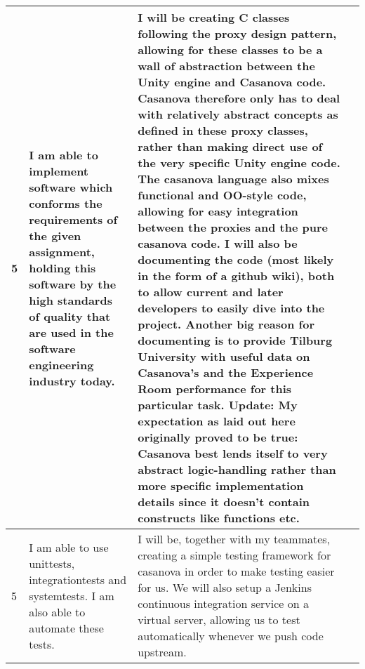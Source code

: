 \documentclass[11pt]{article}
\begin{document}
\newpage
\begin{tabularx}{400pt}{|l|X|X|X|}
\hline 5 & I am able to implement software
which conforms the requirements
of the given assignment,
holding this software
by the high standards of
quality that are used in the
software engineering industry
today. & I will be creating C classes following the proxy design
pattern, allowing for these classes to be a wall of
abstraction between the Unity engine and Casanova
code. Casanova therefore only has to deal with relatively
abstract concepts as defined in these proxy
classes, rather than making direct use of the very specific
Unity engine code. The casanova language also
mixes functional and OO-style code, allowing for easy
integration between the proxies and the pure casanova
code. I will also be documenting the code (most likely
in the form of a github wiki), both to allow current and
later developers to easily dive into the project. Another
big reason for documenting is to provide Tilburg
University with useful data on Casanova’s and the Experience
Room performance for this particular task. Update:  My expectation as laid out here originally proved to be true: Casanova best lends itself to very abstract logic-handling rather than more specific implementation details since it doesn't contain constructs like functions etc.\\
\hline 5 & I am able to use unittests,
integrationtests and systemtests.
I am also able to
automate these tests. & I will be, together with my teammates, creating a simple
testing framework for casanova in order to make
testing easier for us. We will also setup a Jenkins
continuous integration service on a virtual server, allowing
us to test automatically whenever we push code
upstream. \\ \hline
\end{tabularx}
\end{document}
